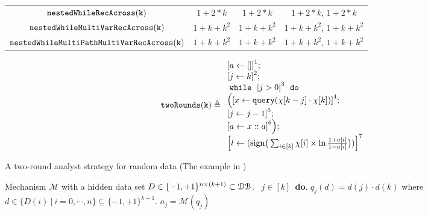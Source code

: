 \begin{center}
{\begin{tabular}{ c c c c}
         $ \mathtt{nestedWhileRecAcross(k)}$ & $1 + 2*k$ & $1 + 2*k$ & $1 + 2*k$, $1 + 2*k$   \\
         $ \mathtt{nestedWhileMultiVarRecAcross(k)}$ & $1 + k + k^2$ & $1 + k + k^2$  & $1 + k + k^2$,  $1 + k + k^2$  \\
         $ \mathtt{nestedWhileMultiPathMultiVarRecAcross(k)}$ & $1 + k + k^2$ & $1 + k + k^2$  & $1 + k + k^2$,  $1 + k + k^2$  \\
        \end{tabular}
}  
      \end{center}
    \begin{example}
        \[
            \kw{twoRounds(k)} \triangleq
        \begin{array}{l}
               \clabel{ a \leftarrow []}^{1} ; \\
                \clabel{\assign{j}{k} }^{2} ; \\
                \ewhile ~ \clabel{j > 0}^{3} ~ \edo ~ \\
                \Big(
                 \clabel{\assign{x}{\query(\chi[k - j]\cdot \chi[k])} }^{4}  ; \\
                 \clabel{\assign{j}{j-1}}^{5} ;\\
                \clabel{a \leftarrow x :: a}^{6}       \Big);\\
                \clabel{l \leftarrow (\mathrm{sign}\big (\sum_{i\in [k]} \chi[i]\times\ln\frac{1+a[i]}{1-a[i]} \big ))}^{7}\\
            \end{array}
        \]
        \begin{algorithm}
        \footnotesize
        \caption{A two-round analyst strategy for random data (The example in  \cite{dwork2015generalization})}
        \label{alg:twoRound}
        \begin{algorithmic}
        \REQUIRE Mechanism $\mathcal{M}$ with a hidden data set $D \in \{-1,+1\}^{n\times (k+1)} \subset \mathcal{DB}$.
        \ $j\in [k]$\ {\bf do}.  
        \STATE {} $q_j(d)=d(j)\cdot d(k)$ where $d \in \{D(i) ~|~ i = 0, \cdots, n\} \subseteq \{-1,+1\}^{k+1}$.
        \STATE {} $a_j=\mathcal{M}(q_j)$ 
        \STATE \qquad {}

\end{algorithmic}
\end{algorithm}
\end{example}

